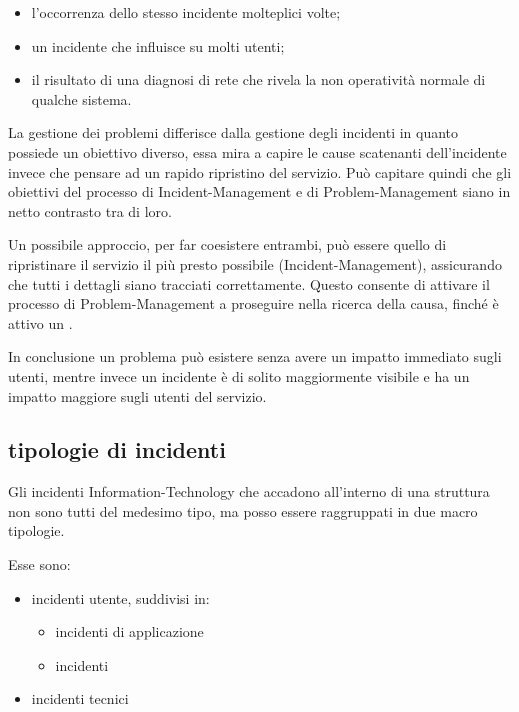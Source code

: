 \begin{itemize}
\item{l'occorrenza dello stesso incidente molteplici volte;}
\item{un incidente che influisce su molti utenti;}
\item{il risultato di una diagnosi di rete che rivela la non operatività normale di qualche sistema.}
\end{itemize}

La gestione dei problemi differisce dalla gestione degli incidenti in quanto possiede un obiettivo diverso, essa mira a capire le cause scatenanti dell'incidente invece che pensare ad un rapido ripristino del servizio. Può capitare quindi che gli obiettivi del processo di \ac{Incident-Management} e di \ac{Problem-Management} siano in netto contrasto tra di loro.

Un possibile approccio, per far coesistere entrambi, può essere quello di ripristinare il servizio il più presto possibile (\ac{Incident-Management}), assicurando che tutti i dettagli siano tracciati correttamente. Questo consente di attivare il processo di \ac{Problem-Management} a proseguire nella ricerca della causa, finché è attivo un .

In conclusione un problema può esistere senza avere un impatto immediato sugli utenti, mentre invece un incidente è di solito maggiormente visibile e ha un impatto maggiore sugli utenti del servizio.

\subsection[Tipologie di incidenti]{tipologie di incidenti}
\label{prc-incident-typology}
Gli incidenti \acs{Information-Technology} che accadono all'interno di una struttura non sono tutti del medesimo tipo, ma posso essere raggruppati in due macro tipologie.

Esse sono:

\begin{itemize}
\item{incidenti utente, suddivisi in:}
\begin{itemize}
\item{incidenti di applicazione}
\item{incidenti }
\end{itemize}
\item{incidenti tecnici}
\end{itemize}

